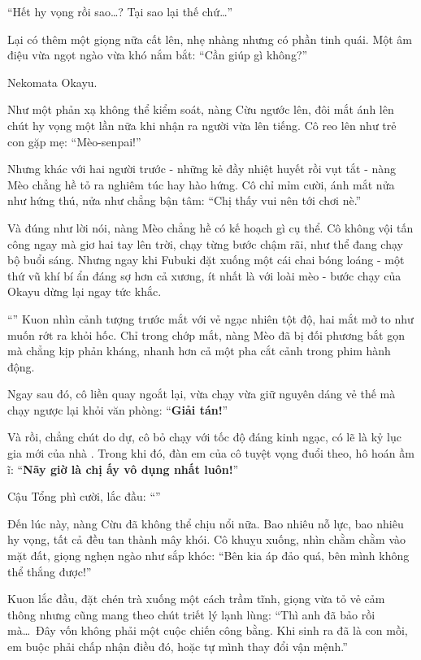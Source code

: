 \documentclass[../main.tex]{subfiles}
\begin{document}
``Hết hy vọng rồi sao\dots? Tại sao lại thế chứ\dots''

Lại có thêm một giọng nữa cất lên, nhẹ nhàng nhưng có phần tinh quái. Một âm điệu vừa ngọt ngào vừa khó nắm bắt: ``Cần giúp gì không?''

Nekomata Okayu.

Như một phản xạ không thể kiểm soát, nàng Cừu ngước lên, đôi mắt ánh lên chút hy vọng  một lần nữa khi nhận ra người vừa lên tiếng. Cô reo lên như trẻ con gặp mẹ: ``Mèo-senpai!''

Nhưng khác với hai người trước - những kẻ đầy nhiệt huyết rồi vụt tắt - nàng Mèo chẳng hề tỏ ra nghiêm túc hay hào hứng. Cô chỉ mỉm cười, ánh mắt nửa như hứng thú, nửa như chẳng bận tâm: ``Chị thấy vui nên tới chơi nè.''

Và đúng như lời nói, nàng Mèo chẳng hề có kế hoạch gì cụ thể. Cô không vội tấn công ngay mà giơ hai tay lên trời, chạy từng bước chậm rãi, như thể đang chạy bộ buổi sáng. Nhưng ngay khi Fubuki đặt xuống một cái chai bóng loáng - một thứ vũ khí bí ẩn đáng sợ hơn cả xương, ít nhất là với loài mèo - bước chạy của Okayu dừng lại ngay tức khắc.


``'' Kuon nhìn cảnh tượng trước mắt với vẻ ngạc nhiên tột độ, hai mắt mở to như muốn rớt ra khỏi hốc. Chỉ trong chớp mắt, nàng Mèo đã bị đối phương bắt gọn mà chẳng kịp phản kháng, nhanh hơn cả một pha cắt cảnh trong phim hành động.

Ngay sau đó, cô liền quay ngoắt lại, vừa chạy vừa giữ nguyên dáng vẻ thế mà chạy ngược lại khỏi văn phòng: ``\textbf{Giải tán!}''

Và rồi, chẳng chút do dự, cô bỏ chạy với tốc độ đáng kinh ngạc, có lẽ là kỷ lục gia mới của nhà \hll. Trong khi đó, đàn em của cô tuyệt vọng đuổi theo, hô hoán ầm ĩ: ``\textbf{Nãy giờ là chị ấy vô dụng nhất luôn!}''

Cậu Tổng phì cười, lắc đầu: ``''

Đến lúc này, nàng Cừu đã không thể chịu nổi nữa. Bao nhiêu nỗ lực, bao nhiêu hy vọng, tất cả đều tan thành mây khói. Cô khuỵu xuống, nhìn chằm chằm vào mặt đất, giọng nghẹn ngào như sắp khóc: ``Bên kia áp đảo quá, bên mình không thể thắng được!''

Kuon lắc đầu, đặt chén trà xuống một cách trầm tĩnh, giọng vừa tỏ vẻ cảm thông nhưng cũng mang theo chút triết lý lạnh lùng: ``Thì anh đã bảo rồi mà\dots\ Đây vốn không phải một cuộc chiến công bằng. Khi sinh ra đã là con mồi, em buộc phải chấp nhận điều đó, hoặc tự mình thay đổi vận mệnh.''
\end{document}
